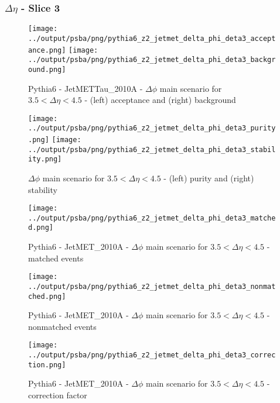 \documentclass[11pt]{book}
\begin{document}
\clearpage
\subsubsection{$\Delta\eta$ - Slice 3}

\begin{figure}[ht]
\centering
\texttt{[image: ../output/psba/png/pythia6\_z2\_jetmet\_delta\_phi\_deta3\_acceptance.png]}
\texttt{[image: ../output/psba/png/pythia6\_z2\_jetmet\_delta\_phi\_deta3\_background.png]}
\caption{Pythia6 - JetMETTau\_2010A - $\Delta\phi$ main scenario for $3.5 < \Delta\eta < 4.5$ - (left) acceptance and (right) background}
\label{fig:p6_jetmet_delta_phi_deta3_ab}
\end{figure}

\begin{figure}[ht]
\centering
\texttt{[image: ../output/psba/png/pythia6\_z2\_jetmet\_delta\_phi\_deta3\_purity.png]}
\texttt{[image: ../output/psba/png/pythia6\_z2\_jetmet\_delta\_phi\_deta3\_stability.png]}
\caption{$\Delta\phi$ main scenario for $3.5 < \Delta\eta < 4.5$ - (left) purity and (right) stability}
\label{fig:p6_jetmet_delta_phi_deta3_ps}
\end{figure}

\begin{figure}[ht]
\centering
\texttt{[image: ../output/psba/png/pythia6\_z2\_jetmet\_delta\_phi\_deta3\_matched.png]}
\caption{Pythia6 - JetMET\_2010A - $\Delta\phi$ main scenario for $3.5 < \Delta\eta < 4.5$ - matched events}
\label{fig:p6_jetmet_delta_phi_deta3_matched}
\end{figure}

\begin{figure}[ht]
\centering
\texttt{[image: ../output/psba/png/pythia6\_z2\_jetmet\_delta\_phi\_deta3\_nonmatched.png]}
\caption{Pythia6 - JetMET\_2010A - $\Delta\phi$ main scenario for $3.5 < \Delta\eta < 4.5$ - nonmatched events}
\label{fig:p6_jetmet_delta_phi_deta3_nonmatched}
\end{figure}

\begin{figure}[ht]
\centering
\texttt{[image: ../output/psba/png/pythia6\_z2\_jetmet\_delta\_phi\_deta3\_correction.png]}
\caption{Pythia6 - JetMET\_2010A - $\Delta\phi$ main scenario for $3.5 < \Delta\eta < 4.5$ - correction factor}
\label{fig:p6_jetmet_delta_phi_deta3_correction}
\end{figure}
\end{document}
